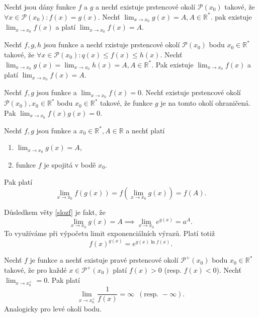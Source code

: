 \begin{veta}
Nechť jsou dány funkce $f$ a $g$ a nechť existuje prstencové okolí
$\mathscr P(x_0)$ takové, že $\forall x \in \mathscr P(x_0):f(x)=g(x).$
Nechť $\lim_{x\to x_0}g(x)=A, A\in \mathbb R^*.$ pak existuje $\lim_{x\to x_0}f(x)$
a platí $\lim_{x\to x_0}f(x)=A.$
\end{veta}

\begin{veta}
Nechť $f,g,h$ jsou funkce a nechť rxistuje prstencové okolí $\mathscr P(x_0)$
bodu $x_0\in \mathbb R^*$ takové, že $\forall x \in \mathscr P(x_0):q(x)\leq f(x)\leq h(x).$
Nechť $\lim_{x\to x_0}g(x)=\lim_{x\to x_0}h(x)=A, A \in \mathbb R^*.$ Pak existuje
$\lim_{x\to x_0}f(x)$ a  platí $ \lim_{x\to x_0}f(x) = A.$
\end{veta}

\begin{veta}
Nechť $f,g$ jsou funkce a $\lim_{x\to x_0}f(x)=0.$ Nechť existuje prstencové
okolí $\mathscr P(x_0), x_0\in \mathbb R^*$ bodu $x_0\in \mathbb R^*$ takové, že
funkce $g$ je na tomto okolí ohraničená. Pak $\lim_{x\to x_0}f(x)g(x)=0.$
\end{veta}

\begin{veta}\label{slozf}
Nechť $f,g$ jsou funkce a $x_0\in \mathbb R^*, A \in \mathbb R$ a nechť platí
\begin{enumerate}[$i.$]
\item $\lim_{x\to x_0}g(x)=A,$
\item funkce $f$ je spojitá v bodě $x_0.$
\end{enumerate}
Pak platí
$$\lim_{x\to x_0}f \left ( g(x) \right ) =f \left ( \lim_{x\to x_0}g(x) \right ) =f(A).$$
\end{veta}

\begin{pozn}
    Důsledkem věty \ref{slozf} je fakt, že
    $$\lim_{x\to x_0}g(x)=A \implies \lim_{x\to x_0}e^{g(x)}=a^A.$$
    To využíváme při výpočetu limit exponenciálních výrazů. Platí totiž
    $$f(x)^{g(x)}=e^{g(x)\ln f(x)}.$$
\end{pozn}

\begin{veta}
Nechť $f$ je funkce a nechť existuje pravé prstencové okolí $\mathscr P^+(x_0)$ bodu
$x_0\in \mathbb R^*$ takové, že pro každé $x\in \mathscr P^+(x_0)$ platí
$f(x)>0$ (resp. $f(x)<0$). Nechť $\lim_{x\to x_0^+}=0.$ Pak platí
$$\lim_{x\to x_0^+} \frac{1}{f(x)}=\infty \,\,\, (\textrm{resp. } -\infty).$$
Analogicky pro levé okolí bodu.
\end{veta}

